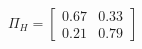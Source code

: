 \documentclass[border=3mm,preview]{standalone}\usepackage{amsmath}
\begin{document}
\[
\Pi_{H}= 
\left[\begin{array}{cc} 
0.67 & 0.33 \\ 
0.21 & 0.79 
\end{array}\right] \] 
\end{document}
